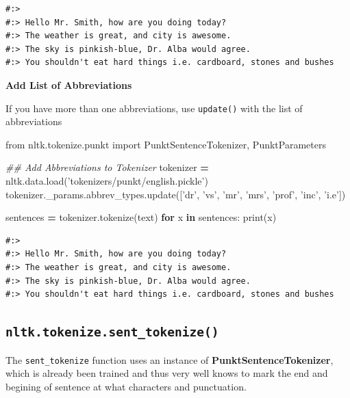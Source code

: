 \documentclass[
]{book}
\newenvironment{Shaded}{\begin{snugshade}}{\end{snugshade}}
\newcommand{\BuiltInTok}[1]{#1}
\newcommand{\CommentTok}[1]{\textcolor[rgb]{0.37,0.37,0.37}{\textit{#1}}}
\newcommand{\ControlFlowTok}[1]{\textcolor[rgb]{0.27,0.27,0.27}{\textbf{#1}}}
\newcommand{\ImportTok}[1]{#1}
\newcommand{\KeywordTok}[1]{\textcolor[rgb]{0.27,0.27,0.27}{\textbf{#1}}}
\newcommand{\NormalTok}[1]{#1}
\newcommand{\OperatorTok}[1]{\textcolor[rgb]{0.43,0.43,0.43}{\textbf{#1}}}
\newcommand{\StringTok}[1]{\textcolor[rgb]{0.5,0.5,0.5}{#1}}
\begin{document}
\begin{verbatim}
#:> 
#:> Hello Mr. Smith, how are you doing today?
#:> The weather is great, and city is awesome.
#:> The sky is pinkish-blue, Dr. Alba would agree.
#:> You shouldn't eat hard things i.e. cardboard, stones and bushes
\end{verbatim}

\textbf{Add List of Abbreviations}

If you have more than one abbreviations, use \texttt{update()} with the list of abbreviations

\begin{Shaded}
\begin{Highlighting}[]
\ImportTok{from}\NormalTok{ nltk.tokenize.punkt }\ImportTok{import}\NormalTok{ PunktSentenceTokenizer, PunktParameters}

\CommentTok{## Add Abbreviations to Tokenizer}
\NormalTok{tokenizer }\OperatorTok{=}\NormalTok{  nltk.data.load(}\StringTok{'tokenizers/punkt/english.pickle'}\NormalTok{)}
\NormalTok{tokenizer._params.abbrev_types.update([}\StringTok{'dr'}\NormalTok{, }\StringTok{'vs'}\NormalTok{, }\StringTok{'mr'}\NormalTok{, }\StringTok{'mrs'}\NormalTok{, }\StringTok{'prof'}\NormalTok{, }\StringTok{'inc'}\NormalTok{, }\StringTok{'i.e'}\NormalTok{])}

\NormalTok{sentences }\OperatorTok{=}\NormalTok{ tokenizer.tokenize(text) }
\ControlFlowTok{for}\NormalTok{ x }\KeywordTok{in}\NormalTok{ sentences:}
  \BuiltInTok{print}\NormalTok{(x) }
\end{Highlighting}
\end{Shaded}

\begin{verbatim}
#:> 
#:> Hello Mr. Smith, how are you doing today?
#:> The weather is great, and city is awesome.
#:> The sky is pinkish-blue, Dr. Alba would agree.
#:> You shouldn't eat hard things i.e. cardboard, stones and bushes
\end{verbatim}

\hypertarget{nltk.tokenize.sent_tokenize}{%
\subsection{\texorpdfstring{\texttt{nltk.tokenize.sent\_tokenize()}}{nltk.tokenize.sent\_tokenize()}}\label{nltk.tokenize.sent_tokenize}}

The \texttt{sent\_tokenize} function uses an instance of \textbf{PunktSentenceTokenizer}, which is already been trained and thus very well knows to mark the end and begining of sentence at what characters and punctuation.
\end{document}
